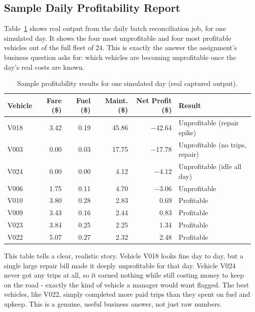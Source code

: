 \documentclass[12pt,a4paper]{article}
\begin{document}
\subsection{Sample Daily Profitability Report}

Table~\ref{tab:profitability} shows real output from the daily batch
reconciliation job, for one simulated day. It shows the four most
unprofitable and four most profitable vehicles out of the full fleet of
24. This is exactly the answer the assignment's business question asks
for: which vehicles are becoming unprofitable once the day's real
costs are known.

\begin{center}
\begin{longtable}{@{}lrrrrp{3.6cm}@{}}
\caption{Sample profitability results for one simulated day (real captured output).}
\label{tab:profitability}\\
\toprule
\textbf{Vehicle} & \textbf{Fare (\$)} & \textbf{Fuel (\$)} & \textbf{Maint. (\$)} & \textbf{Net Profit (\$)} & \textbf{Result} \\
\midrule
\endhead
V018 & 3.42 & 0.19 & 45.86 & $-$42.64 & Unprofitable (repair spike) \\
V003 & 0.00 & 0.03 & 17.75 & $-$17.78 & Unprofitable (no trips, repair) \\
V024 & 0.00 & 0.00 & 4.12  & $-$4.12  & Unprofitable (idle all day) \\
V006 & 1.75 & 0.11 & 4.70  & $-$3.06  & Unprofitable \\
\midrule
V010 & 3.80 & 0.28 & 2.83  & 0.69     & Profitable \\
V009 & 3.43 & 0.16 & 2.44  & 0.83     & Profitable \\
V023 & 3.84 & 0.25 & 2.25  & 1.34     & Profitable \\
V022 & 5.07 & 0.27 & 2.32  & 2.48     & Profitable \\
\bottomrule
\end{longtable}
\end{center}

This table tells a clear, realistic story. Vehicle V018 looks fine day to
day, but a single large repair bill made it deeply unprofitable for that
day. Vehicle V024 never got any trips at all, so it earned nothing while
still costing money to keep on the road - exactly the kind of vehicle a
manager would want flagged. The best vehicles, like V022, simply completed
more paid trips than they spent on fuel and upkeep. This is a genuine,
useful business answer, not just raw numbers.
\end{document}
